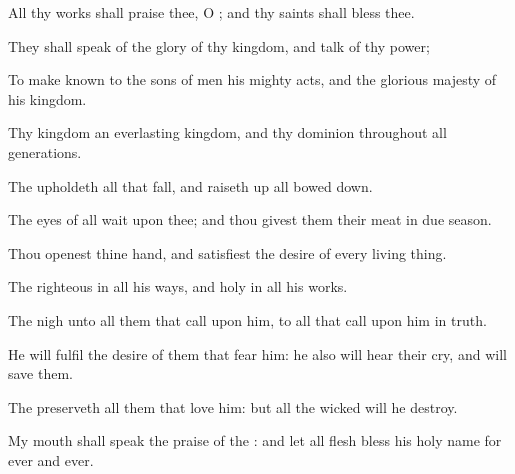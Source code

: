 {\Q {}All thy
works shall
praise thee, O
{}; and thy
saints shall
bless thee.


\par }{\Q {}They shall
speak of the
glory of thy
kingdom, and
talk of thy
power;


\par }{\Q {}To make
known to the
sons of
men his mighty
acts, and the
glorious
majesty of his
kingdom.


\par }{\Q {}Thy
kingdom
{} an
everlasting
kingdom, and thy
dominion
{} throughout
all
generations.


\par }{\Q {}The
{}
upholdeth all that
fall, and raiseth
up all
{} bowed
down.


\par }{\Q {}The
eyes of all
wait upon thee; and thou
givest them their
meat in due
season.


\par }{\Q {}Thou
openest thine
hand, and
satisfiest the
desire of every living
thing.


\par }{\Q {}The
{}
{}
righteous in all his
ways, and
holy in all his
works.


\par }{\Q {}The
{}
{}
nigh unto all them that
call upon him, to all that
call upon him in
truth.


\par }{\Q {}He will
fulfil the
desire of them that
fear him: he also will
hear their
cry, and will
save them.


\par }{\Q {}The
{}
preserveth all them that
love him: but all the
wicked will he
destroy.


\par }{\Q {}My
mouth shall
speak the
praise of the
{}: and let all
flesh
bless his
holy
name for
ever and
ever.




\par }
